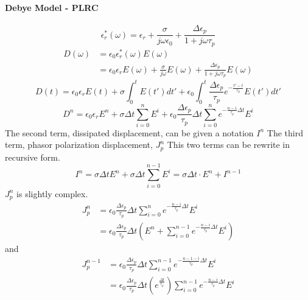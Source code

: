 \paragraph{{\msjh Debye Model - PLRC}}
\begin{displaymath}
  \epsilon_r^*(\omega) = \epsilon_r + \frac{\sigma}{j\omega \epsilon_0} + \frac{\Delta \epsilon_p}{1+j\omega \tau_p}
\end{displaymath}
\begin{displaymath}
  \begin{split}
    D(\omega) & = \epsilon_0 \epsilon_r^*(\omega) E(\omega)\\
    & = \epsilon_0 \epsilon_r E(\omega) + \frac{\sigma}{j\omega} E(\omega) + \frac{\Delta \epsilon_p}{1+j\omega \tau_p}E(\omega)
  \end{split}
\end{displaymath}
\begin{displaymath}
  D(t) = \epsilon_0 \epsilon_r E(t) + \sigma \int_0^t E(t')dt' + \epsilon_0 \int_0^t \frac{\Delta \epsilon_p}{\tau_p}e^{-\frac{t'-t}{\tau_p}}E(t')dt'
\end{displaymath}
\begin{equation}
  D^n = \epsilon_0 \epsilon_rE^n + \sigma \Delta t \sum_{i=0}^{n}E^i + \epsilon_0 \frac{\Delta \epsilon_p}{\tau_p}\Delta t \sum_{i=0}^{n} e^{-\frac{n-i}{\tau_p}\Delta t} E^i
\end{equation}
The second term, dissipated displacement, can be given a notation $I^n$
The third term, phasor polarization displacement, $J_p^n$
This two terms can be rewrite in recursive form.
\begin{equation}
  I^n = \sigma\Delta tE^n + \sigma\Delta t\sum_{i=0}^{n-1}E^i = \sigma\Delta t\cdot E^n + I^{n-1}
\end{equation}
$J_p^n$ is slightly complex.
\begin{equation}
  \begin{split}
    J_p^n & = \epsilon_0\frac{\Delta\epsilon_p}{\tau_p}\Delta t \sum_{i=0}^ne^{-\frac{n-i}{\tau_p}\Delta t}E^i\\
    & = \epsilon_0\frac{\Delta\epsilon_p}{\tau_p}\Delta t \left( E^n + \sum_{i=0}^{n-1}e^{-\frac{n-i}{\tau_p}\Delta t}E^i\right)
  \end{split}
\end{equation}
and 
\begin{equation}
  \begin{split}
    J_p^{n-1} & = \epsilon_0\frac{\Delta\epsilon_p}{\tau_p}\Delta t \sum_{i=0}^{n-1}e^{-\frac{n-1-i}{\tau_p}\Delta t}E^i\\
    & = \epsilon_0\frac{\Delta\epsilon_p}{\tau_p}\Delta t \left( e^{\frac{\Delta t}{\tau_p}} \right) \sum_{i=0}^{n-1}e^{-\frac{n-i}{\tau_p}\Delta t}E^i
  \end{split}
\end{equation}
